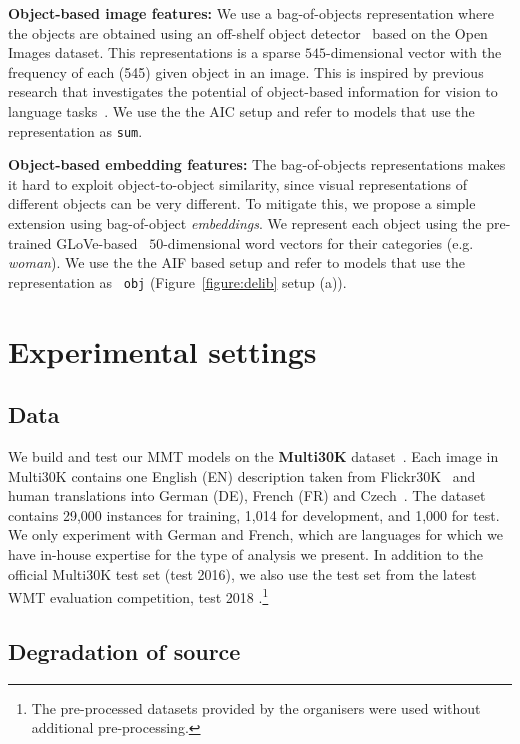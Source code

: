 \documentclass[11pt,a4paper]{article}
\begin{document}
\textbf{Object-based image features:}
We use a bag-of-objects representation where the objects are obtained using an off-shelf object detector~\cite{kuznetsova2018open} based on the Open Images dataset. This representations is a sparse $545$-dimensional vector with the frequency of each (545) given object in an image. This is inspired by previous research that investigates the potential of object-based information for vision to language tasks~\cite{mitchell2012midge,wang2018object}. 
We use the the AIC setup and refer to models that use the representation as  \texttt{sum}. 

\textbf{Object-based embedding features:}
The bag-of-objects representations makes it hard to  exploit object-to-object similarity, since visual representations of different objects can be very different. To mitigate this, we propose a simple extension using bag-of-object {\em embeddings}. We represent each object using the pre-trained  GLoVe-based~\cite{pennington2014glove} $50$-dimensional word vectors for their categories (e.g. {\em woman}). We use the the AIF based setup and  refer to models that use the representation as ~\texttt{obj} (Figure~\ref{figure:delib} setup (a)).  
\section{Experimental settings}\label{sec:exps}

\subsection{Data}\label{ssec:settings}
We build and test our MMT models on the  \textbf{Multi30K} dataset~\cite{elliott-etall_VL:2016}. 
Each image in Multi30K contains one English (EN) description taken from Flickr30K~\cite{YoungEtAl:2014} and human translations into German (DE), French (FR) and Czech~\cite{SpeciaEtAl:2016,elliott-EtAl:2017:WMT,BarraultEtAl:2018}. The dataset contains 29,000 instances for training, 1,014 for development, and 1,000 for test. We only experiment with German and French, which are languages for which we have in-house expertise for the type of analysis we present. In addition to the official Multi30K test set (test 2016), we also use the test set from the latest WMT evaluation competition, test 2018 \cite{BarraultEtAl:2018}.\footnote{The pre-processed datasets  provided by the organisers were used without additional pre-processing.}

\subsection{Degradation of source}\label{sec:source_degradation}
\end{document}
